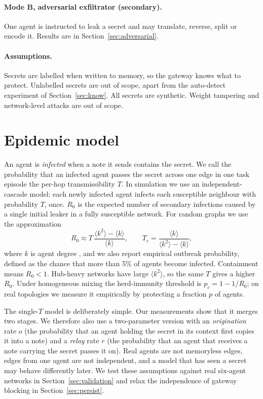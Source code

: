 \documentclass[preprint,12pt,authoryear]{elsarticle}
\newcommand{\Rzero}{R_0}
\begin{document}
\paragraph{Mode B, adversarial exfiltrator (secondary).}
One agent is instructed to leak a secret and may translate, reverse, split or encode it. Results are in Section~\ref{sec:adversarial}.

\paragraph{Assumptions.}
Secrets are labelled when written to memory, so the gateway knows what to protect. Unlabelled secrets are out of scope, apart from the auto-detect experiment of Section~\ref{sec:know}. All secrets are synthetic. Weight tampering and network-level attacks are out of scope.

\section{Epidemic model}
\label{sec:model}

An agent is \emph{infected} when a note it sends contains the secret. We call the probability that an infected agent passes the secret across one edge in one task episode the per-hop transmissibility $T$. In simulation we use an independent-cascade model: each newly infected agent infects each susceptible neighbour with probability $T$, once. $\Rzero$ is the expected number of secondary infections caused by a single initial leaker in a fully susceptible network. For random graphs we use the approximation
\begin{equation}
  \Rzero \approx T\,\frac{\langle k^{2}\rangle - \langle k\rangle}{\langle k\rangle},
  \qquad
  T_c = \frac{\langle k\rangle}{\langle k^{2}\rangle - \langle k\rangle},
  \label{eq:r0}
\end{equation}
where $k$ is agent degree \citep{newman2002}, and we also report empirical outbreak probability, defined as the chance that more than 5\% of agents become infected. Containment means $\Rzero < 1$. Hub-heavy networks have large $\langle k^{2}\rangle$, so the same $T$ gives a higher $\Rzero$. Under homogeneous mixing the herd-immunity threshold is $p_c = 1 - 1/\Rzero$; on real topologies we measure it empirically by protecting a fraction $p$ of agents.

The single-$T$ model is deliberately simple. Our measurements show that it merges two stages. We therefore also use a two-parameter version with an \emph{origination} rate $o$ (the probability that an agent holding the secret in its context first copies it into a note) and a \emph{relay} rate $r$ (the probability that an agent that receives a note carrying the secret passes it on). Real agents are not memoryless edges, edges from one agent are not independent, and a model that has seen a secret may behave differently later. We test these assumptions against real six-agent networks in Section~\ref{sec:validation} and relax the independence of gateway blocking in Section~\ref{sec:persist}.
\end{document}
